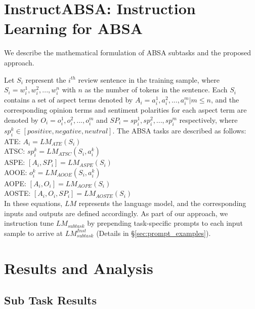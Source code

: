 \documentclass[11pt]{article}
\newcommand{\name}{\textsc{I}nstruct\textsc{ABSA}\xspace}
\begin{document}
\section{\name{}: Instruction Learning for ABSA }

We describe the mathematical formulation of ABSA subtasks and the proposed approach.





Let $S_i$ represent the $i^{th}$ review sentence in the training sample, where $S_i = {w_{i}^1, w_{i}^2, ..., w_{i}^n}$ with $n$ as the number of tokens in the sentence. 
Each $S_i$ contains a set of aspect terms denoted by $A_i = {a_{i}^1, a_{i}^2, ..., a_{i}^m} | m \le n$, and the corresponding opinion terms and sentiment polarities for each aspect term are denoted by $O_{i} = {o_{i}^1, o_{i}^2, ..., o_{i}^m}$ and $SP_{i} = {sp_{i}^1, sp_{i}^2, ..., sp_{i}^m}$ respectively, where $sp_i^k \in [ positive, negative, neutral ]$. 
The ABSA tasks are described as follows:\\
ATE: $A_i = LM_{ATE}(S_i)$\\
ATSC: $sp_i^k = LM_{ATSC}(S_i, a_i^k)$\\
ASPE: $[A_i, SP_i] = LM_{ASPE}(S_i)$\\
AOOE: $o_{i}^k = LM_{AOOE}(S_i, a_i^k)$\\
AOPE: $[A_i, O_i] = LM_{AOPE}(S_i)$\\
AOSTE: $[A_i, O_i, SP_i] = LM_{AOSTE}(S_i)$\\
In these equations, $LM$ represents the language model, and the corresponding inputs and outputs are defined accordingly. As part of our approach, we instruction tune $LM_{subtask}$ by prepending task-specific prompts to each input sample to arrive at $LM_{subtask}^{Inst}$ (Details in \S \ref{sec:prompt_examples}). 





\section{Results and Analysis}
\label{sec_results}

\subsection{Sub Task Results}
\end{document}

